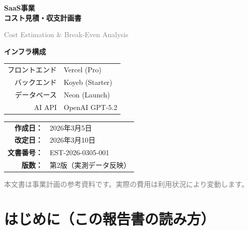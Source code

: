 \documentclass[a4paper,11pt]{ltjsarticle}
\begin{document}
\begin{titlepage}
\centering
\vspace*{3cm}

{\Huge\bfseries\textcolor{headerblue}{SaaS事業\\コスト見積・収支計画書}}\par
\vspace{1cm}
{\Large\textcolor{gray}{Cost Estimation \& Break-Even Analysis}}\par
\vspace{2cm}

\begin{tcolorbox}[
  colback=lightgray,
  colframe=headerblue,
  width=12cm,
  halign=center,
  boxrule=1pt,
]
\large
\textbf{インフラ構成}\par
\vspace{0.5em}
\begin{tabular}{rl}
フロントエンド & Vercel (Pro) \\
バックエンド   & Koyeb (Starter) \\
データベース   & Neon (Launch) \\
AI API        & OpenAI GPT-5.2 \\
\end{tabular}
\end{tcolorbox}

\vspace{2cm}

\begin{tabular}{rl}
\textbf{作成日：} & 2026年3月5日 \\
\textbf{改定日：} & 2026年3月10日 \\
\textbf{文書番号：} & EST-2026-0305-001 \\
\textbf{版数：} & 第2版（実測データ反映） \\
\end{tabular}

\vfill
{\small\textcolor{gray}{本文書は事業計画の参考資料です。実際の費用は利用状況により変動します。}}
\end{titlepage}

\tableofcontents
\newpage

\section{はじめに（この報告書の読み方）}
\end{document}
